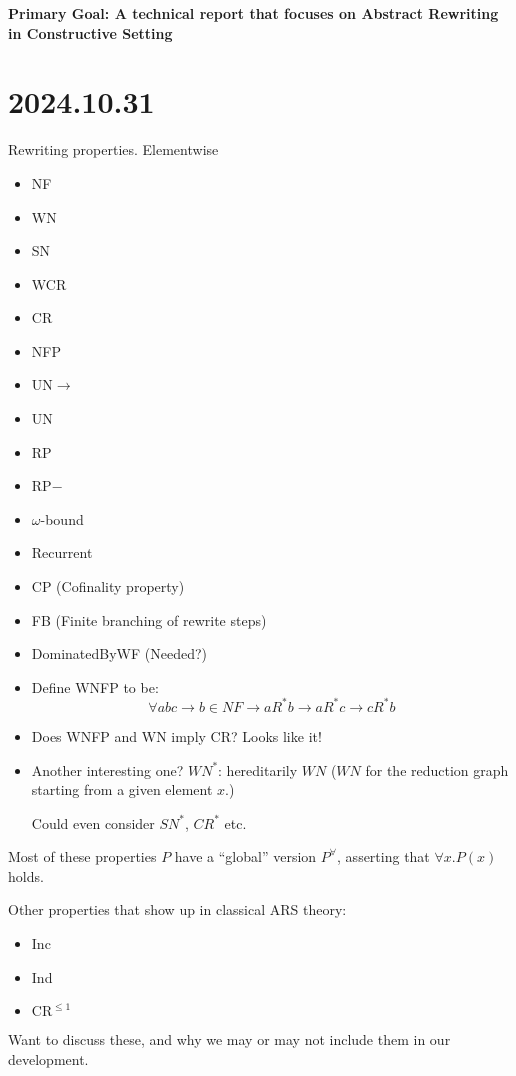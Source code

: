 \documentclass{scrartcl}
\begin{document}
\textbf{Primary Goal: A technical report that focuses on
Abstract Rewriting in Constructive Setting }

\section{2024.10.31}

Rewriting properties.
Elementwise
\begin{itemize}
  \item NF
  \item WN
  \item SN
  \item WCR
  \item CR
  \item NFP
  \item UN$\to$
  \item UN
  \item RP
  \item RP$-$
  \item $\omega$-bound
  \item Recurrent
  \item CP (Cofinality property)
  \item FB (Finite branching of rewrite steps)
  \item DominatedByWF (Needed?)
  \item Define WNFP to be:
  \[\forall a b c \to b \in NF \to a R^* b \to a R^* c \to c R^* b \]
  \item Does WNFP and WN imply CR?  Looks like it!
  \item Another interesting one? $WN^*$: hereditarily $WN$ ($WN$ for the reduction graph starting from a given element $x$.)

  Could even consider $SN^*$, $CR^*$ etc.
\end{itemize}
Most of these properties $P$ have a ``global'' version $P^\forall$, asserting that $\forall x. P(x)$ holds.

Other properties that show up in classical ARS theory:
\begin{itemize}
  \item Inc
  \item Ind
  \item $\mathrm{CR}^{\le 1}$
\end{itemize}
Want to discuss these, and why we may or may not include them in our
development.
\end{document}
